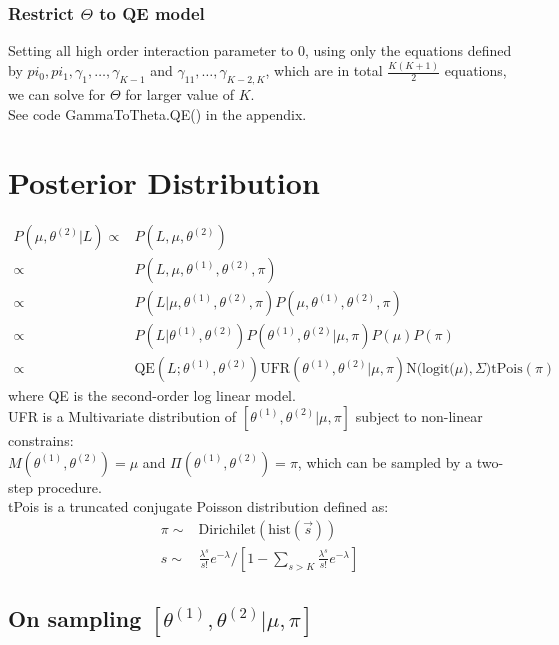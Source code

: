 \documentclass[11 pt, a4paper]{article}  %
\begin{document}
\subsubsection{Restrict $\Theta$ to QE model}
Setting all high order interaction parameter to $0$, using only the equations defined by $pi_0, pi_1, \gamma_1,\ldots,\gamma_{K-1}$ and $\gamma_{11},\ldots, \gamma_{K-2,K}$, which are in total $\frac{K(K+1)}{2}$ equations, we can solve for $\Theta$ for larger value of $K$.\\
See code GammaToTheta.QE() in the appendix.

\newpage
\section{Posterior Distribution}
\begin{align*}
P(\mu, \theta^{(2)} |L) \propto & P(L, \mu, \theta^{(2)}) \\
\propto &  P(L, \mu ,\theta^{(1)},\theta^{(2)},\pi) \\
\propto & P(L | \mu, \theta^{(1)},\theta^{(2)},\pi) P(\mu, \theta^{(1)},\theta^{(2)},\pi)\\
\propto & P(L | \theta^{(1)},\theta^{(2)}) P(\theta^{(1)},\theta^{(2)} |\mu, \pi ) P(\mu) P(\pi)\\
\propto & \text{QE}(L; \theta^{(1)},\theta^{(2)}) \text{UFR}(\theta^{(1)},\theta^{(2)} |\mu, \pi ) \text{N(logit(}\mu),\Sigma) \text{tPois}(\pi)
\end{align*}
where QE is the second-order log linear model.\\
UFR is a Multivariate distribution of $[\theta^{(1)},\theta^{(2)}|\mu, \pi]$ subject to non-linear constrains:\\
 $M( \theta^{(1)},\theta^{(2)}) =\mu$ and $\Pi (\theta^{(1)},\theta^{(2)}) = \pi$, which can be sampled by a two-step procedure.\\
tPois is a truncated conjugate Poisson distribution defined as:
\begin{align*}
\pi \sim & \text{Dirichilet}(\text{hist}(\vec{s}))\\
s \sim & \frac{\lambda^s}{s!}e^{-\lambda}/[1- \sum_{s>K}\frac{\lambda^s}{s!}e^{-\lambda}]
\end{align*}

\subsection{On sampling $[\theta^{(1)},\theta^{(2)} |\mu, \pi]$}
\end{document}
